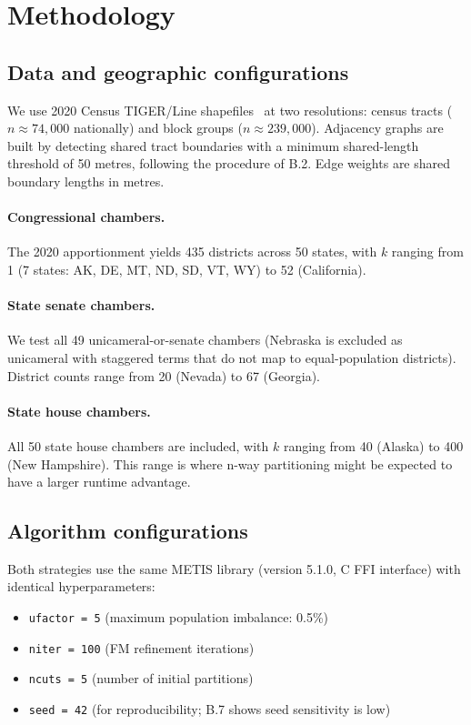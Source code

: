 \section{Methodology}
\label{sec:methodology}

\subsection{Data and geographic configurations}

We use 2020 Census TIGER/Line shapefiles~\citep{tiger-census} at two
resolutions: census tracts ($n \approx 74{,}000$ nationally) and block
groups ($n \approx 239{,}000$).
Adjacency graphs are built by detecting shared tract boundaries with a
minimum shared-length threshold of 50 metres, following the procedure of
B.2.  Edge weights are shared boundary lengths in metres.

\paragraph{Congressional chambers.}
The 2020 apportionment yields 435 districts across 50 states, with $k$
ranging from 1 (7 states: AK, DE, MT, ND, SD, VT, WY) to 52 (California).

\paragraph{State senate chambers.}
We test all 49 unicameral-or-senate chambers (Nebraska is excluded as
unicameral with staggered terms that do not map to equal-population
districts).  District counts range from 20 (Nevada) to 67 (Georgia).

\paragraph{State house chambers.}
All 50 state house chambers are included, with $k$ ranging from 40
(Alaska) to 400 (New Hampshire).  This range is where n-way partitioning
might be expected to have a larger runtime advantage.

\subsection{Algorithm configurations}

Both strategies use the same METIS library (version 5.1.0, C FFI interface)
with identical hyperparameters:

\begin{itemize}
  \item \texttt{ufactor = 5} (maximum population imbalance: 0.5\%)
  \item \texttt{niter = 100} (FM refinement iterations)
  \item \texttt{ncuts = 5} (number of initial partitions)
  \item \texttt{seed = 42} (for reproducibility; B.7 shows seed sensitivity
    is low)
\end{itemize}

